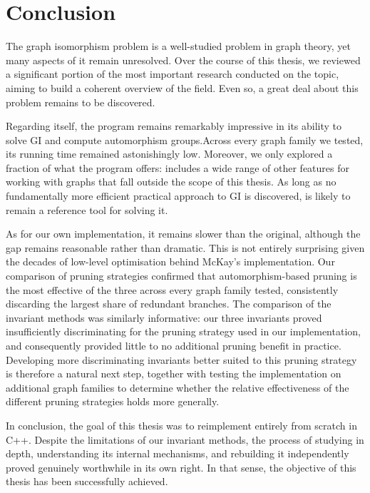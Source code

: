 \chapter{Conclusion}

The graph isomorphism problem is a well-studied problem in graph theory, yet many aspects of it remain unresolved. Over the course of this thesis, we reviewed a significant portion of the most important research conducted on the topic, aiming to build a coherent overview of the field. Even so, a great deal about this problem remains to be discovered.

Regarding \Naut{} itself, the program remains remarkably impressive in its ability to solve GI and compute automorphism groups.\@ Across every graph family we tested, its running time remained astonishingly low. Moreover, we only explored a fraction of what the program offers: \Naut{} includes a wide range of other features for working with graphs that fall outside the scope of this thesis. As long as no fundamentally more efficient practical approach to GI is discovered, \Naut{} is likely to remain a reference tool for solving it.

As for our own implementation, it remains slower than the original, although the gap remains reasonable rather than dramatic. This is not entirely surprising given the decades of low-level optimisation behind McKay's implementation. Our comparison of pruning strategies confirmed that automorphism-based pruning is the most effective of the three across every graph family tested, consistently discarding the largest share of redundant branches. The comparison of the invariant methods was similarly informative: our three invariants proved insufficiently discriminating for the pruning strategy used in our implementation, and consequently provided little to no additional pruning benefit in practice. Developing more discriminating invariants better suited to this pruning strategy is therefore a natural next step, together with testing the implementation on additional graph families to determine whether the relative effectiveness of the different pruning strategies holds more generally.

In conclusion, the goal of this thesis was to reimplement \Naut{} entirely from scratch in C++. Despite the limitations of our invariant methods, the process of studying \Naut{} in depth, understanding its internal mechanisms, and rebuilding it independently proved genuinely worthwhile in its own right. In that sense, the objective of this thesis has been successfully achieved.

